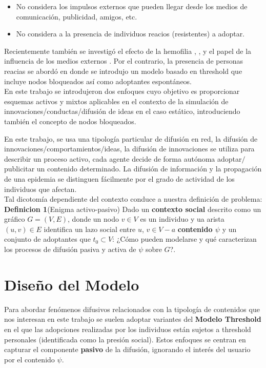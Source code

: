 \documentclass{article}
\begin{document}
\begin{itemize}
	\item No considera los impulsos externos que pueden llegar desde los medios de comunicación, publicidad, amigos, etc.
	\item No considera a la presencia de individuos reacios (resistentes) a adoptar.
\end{itemize}

Recientemente también se investigó el efecto de la hemofilia \cite[Aral 2009]{aral:2009}, \Cite[Bakshy 2012]{bakshy:2012}, \cite[Watts 2011]{watts:2011} y el papel de la influencia de los medios externos \cite[Toole 2012]{toole:2012}. Por el contrario, la presencia de personas reacias se abordó en \cite[Ruan 2015]{ruan:2015} donde se introdujo un modelo basado en threshold que incluye nodos bloqueados así como adoptantes espontáneos.
\\
En este trabajo se introdujeron dos enfoques cuyo objetivo es proporcionar esquemas activos y mixtos aplicables en el contexto de la simulación de innovaciones/conductas/difusión de ideas en el caso estático, introduciendo también el concepto de nodos bloqueados.

En este trabajo, se usa una tipología particular de difusión en red, la difusión de innovaciones$/$comportamientos$/$ideas, la difusión de innovaciones se utiliza para describir un proceso activo, cada agente decide de forma autónoma adoptar$/$publicitar un contenido determinado. La difusión de información y la propagación de una epidemia se distinguen fácilmente por el grado de actividad de los individuos que afectan.\\ 
Tal dicotomía dependiente del contexto conduce a nuestra definición de problema:\\

\textbf{Definicion 1}(Enigma activo-pasivo) Dado un \textbf{contexto social} descrito como un gráfico $G = (V, E)$, donde un nodo $v \in V$ es un individuo y ua arista $(u, v) \in E$ identifica un lazo social entre $u$, $v \in V - a$ \textbf{contenido $\psi$} y un conjunto de adoptantes que $t_0 \subset V$: ¿Cómo pueden modelarse y qué caracterizan los procesos de difusión pasiva y activa de $\psi$ sobre $G$?.
 
\section{Diseño del Modelo}
Para abordar fenómenos difusivos relacionados con la tipología de contenidos que nos interesan en este trabajo se suelen adoptar variantes del \textbf{Modelo Threshold} en el que las adopciones realizadas por los individuos están sujetos a threshold personales (identificada como la presión social). Estos enfoques se centran en capturar el componente \textbf{pasivo} de la difusión, ignorando el interés del usuario por el contenido $\psi$.
\end{document}
